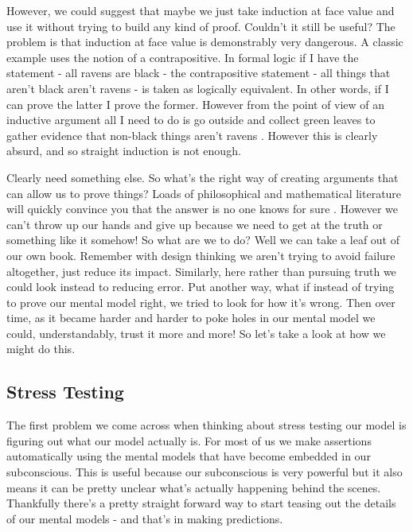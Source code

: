 \documentclass[11pt]{book}
\begin{document}
However, we could suggest that maybe we just take induction at face value and use it without trying to build any kind of proof. Couldn't it still be useful? The problem is that induction at face value is demonstrably very dangerous. A classic example uses the notion of a contrapositive. In formal logic if I have the statement - all ravens are black - the contrapositive statement - all things that aren't black aren't ravens - is taken as logically equivalent. In other words, if I can prove the latter I prove the former. However from the point of view of an inductive argument all I need to do is go outside and collect green leaves to gather evidence that non-black things aren't ravens \cite{lipton}. However this is clearly absurd, and so straight induction is not enough. 
\newline

Clearly need something else. So what's the right way of creating arguments that can allow us to prove things? Loads of philosophical and mathematical literature will quickly convince you that the answer is no one knows for sure \cite{lipton} \cite{tkuhn}. However we can't throw up our hands and give up because we need to get at the truth or something like it somehow! So what are we to do? Well we can take a leaf out of our own book. Remember with design thinking we aren't trying to avoid failure altogether, just reduce its impact. Similarly, here rather than pursuing truth we could look instead to reducing error. Put another way, what if instead of trying to prove our mental model right, we tried to look for how it's wrong. Then over time, as it became harder and harder to poke holes in our mental model we could, understandably, trust it more and more! So let's take a look at how we might do this. 

\subsection{Stress Testing}
The first problem we come across when thinking about stress testing our model is figuring out what our model actually is. For most of us we make assertions automatically using the mental models that have become embedded in our subconscious. This is useful because our subconscious is very powerful \cite{newport} but it also means it can be pretty unclear what's actually happening behind the scenes. Thankfully there's a pretty straight forward way to start teasing out the details of our mental models - and that's in making predictions. 
\newline
\end{document}
